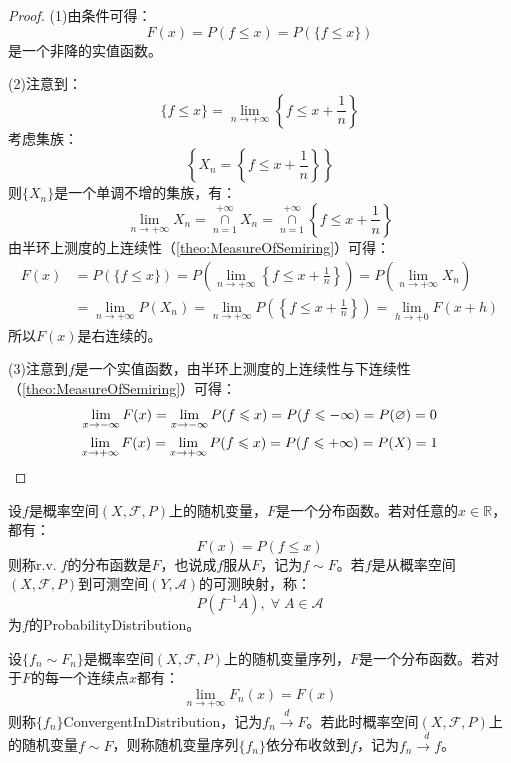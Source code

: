 \begin{proof}
	(1)由条件可得：
	\begin{equation*}
		F(x)=P(f\leqslant x)=P(\{f\leqslant x\})
	\end{equation*}
	是一个非降的实值函数。\par
	(2)注意到：
	\begin{equation*}
		\{f\leqslant x\}=\lim_{n\to+\infty}\left\{f\leqslant x+\frac{1}{n}\right\}
	\end{equation*}
	考虑集族：
	\begin{equation*}
		\left\{X_n=\left\{f\leqslant x+\frac{1}{n}\right\}\right\}
	\end{equation*}
	则$\{X_n\}$是一个单调不增的集族，有：
	\begin{equation*}
		\lim_{n\to+\infty}X_n=\underset{n=1}{\overset{+\infty}{\cap}}X_n=\underset{n=1}{\overset{+\infty}{\cap}}\left\{f\leqslant x+\frac{1}{n}\right\}
	\end{equation*}
	由半环上测度的上连续性（\cref{theo:MeasureOfSemiring}）可得：
	\begin{align*}
		F(x)&=P(\{f\leqslant x\})
		=P\left(\lim_{n\to+\infty}\left\{f\leqslant x+\frac{1}{n}\right\}\right)
		=P\left(\lim_{n\to+\infty}X_n\right) \\
		&=\lim_{n\to+\infty}P(X_n)
		=\lim_{n\to+\infty}P\left(\left\{f\leqslant x+\frac{1}{n}\right\}\right)
		=\lim_{h\to+0}F(x+h)
	\end{align*}
	所以$F(x)$是右连续的。\par
	(3)注意到$f$是一个实值函数，由半环上测度的上连续性与下连续性（\cref{theo:MeasureOfSemiring}）可得：
	\begin{gather*}
		\lim_{x\to-\infty}F(x)=\lim_{x\to-\infty}P(f\leqslant x)=P(f\leqslant-\infty)=P(\varnothing)=0 \\
		\lim_{x\to+\infty}F(x)=\lim_{x\to+\infty}P(f\leqslant x)=P(f\leqslant+\infty)=P(X)=1\qedhere
	\end{gather*}
\end{proof}
\begin{definition}
	设$f$是概率空间$(X,\mathscr{F},P)$上的随机变量，$F$是一个分布函数。若对任意的$x\in\mathbb{R}$，都有：
	\begin{equation*}
		F(x)=P(f\leqslant x)
	\end{equation*}
	则称r.v.$\;f$的分布函数是$F$，也说成$f$服从$F$，记为$f\sim F$。若$f$是从概率空间$(X,\mathscr{F},P)$到可测空间$(Y,\mathscr{A})$的可测映射，称：
	\begin{equation*}
		P(f^{-1}A),\;\forall\;A\in \mathscr{A}
	\end{equation*}
	为$f$的\gls{ProbabilityDistribution}。
\end{definition}
\begin{definition}
	设$\{f_n\sim F_n\}$是概率空间$(X,\mathscr{F},P)$上的随机变量序列，$F$是一个分布函数。若对于$F$的每一个连续点$x$都有：
	\begin{equation*}
		\lim_{n\to+\infty}F_n(x)=F(x)
	\end{equation*}
	则称$\{f_n\}$\gls{ConvergentInDistribution}，记为$f_n\overset{d}{\longrightarrow}F$。若此时概率空间$(X,\mathscr{F},P)$上的随机变量$f\sim F$，则称随机变量序列$\{f_n\}$依分布收敛到$f$，记为$f_n\overset{d}{\longrightarrow f}$。
\end{definition}

